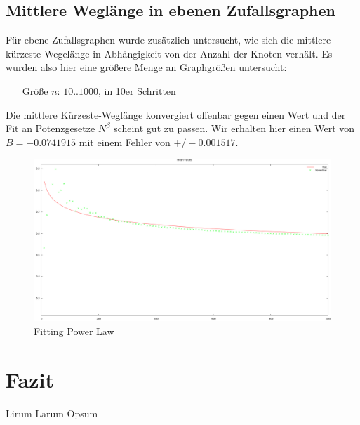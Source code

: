 \documentclass[10pt]{article}
\begin{document}
\subsection{Mittlere Weglänge in ebenen Zufallsgraphen}
Für ebene Zufallsgraphen wurde zusätzlich untersucht, wie sich die mittlere kürzeste Wegelänge in Abhängigkeit von der Anzahl der Knoten verhält. Es wurden also hier eine größere Menge an Graphgrößen untersucht:
\begin{itemize}
\item[\quad Größe $n$:] $10..1000$, in 10er Schritten
\end{itemize}
Die mittlere Kürzeste-Weglänge konvergiert offenbar gegen einen Wert und der Fit an Potenzgesetze $N^\beta$ scheint gut zu passen. Wir erhalten hier einen Wert von $B= -0.0741915$ mit einem Fehler von $+/- 0.001517$.
\begin{figure}[!htb]
  \centering
  \includegraphics[width=\linewidth]{../Results/Power_PlanarMean.png}
  \caption{Fitting Power Law}
\label{fig:planarMean}
\end{figure}

\section{Fazit}
Lirum Larum Opsum

\newpage

 

\end{document}
